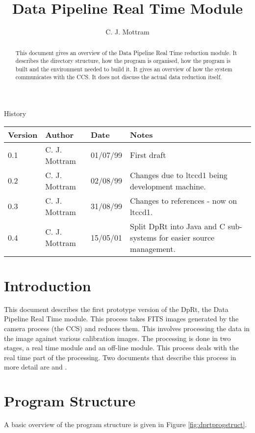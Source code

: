 \documentclass[10pt,a4paper]{article}
\title{Data Pipeline Real Time Module}
\author{C. J. Mottram}
\date{}
\begin{document}
\thispagestyle{empty}
\maketitle
\begin{abstract}
This document gives an overview of the Data Pipeline Real Time reduction module. It describes the directory structure,
how the program is organised, how the program is built and the environment needed to build it. It gives an overview
of how the system communicates with the CCS. It does not discuss the actual data reduction itself.
\end{abstract}

\centerline{\Large History}
\begin{center}
\begin{tabular}{|l|l|l|p{15em}|}
\hline
{\bf Version} & {\bf Author} & {\bf Date} & {\bf Notes} \\
\hline
0.1 & C. J. Mottram & 01/07/99 & First draft \\
0.2 & C. J. Mottram & 02/08/99 & Changes due to ltccd1 being development machine. \\
0.3 & C. J. Mottram & 31/08/99 & Changes to references - now on ltccd1. \\
0.4 & C. J. Mottram & 15/05/01 & Split DpRt into Java and C sub-systems for easier source management. \\
\hline
\end{tabular}
\end{center}

\newpage
\tableofcontents
\listoffigures
\listoftables
\newpage

\section{Introduction}
This document describes the first prototype version of the DpRt, the Data Pipeline Real Time module. This process
takes FITS images generated by the camera process (the CCS) and reduces them. This involves processing the data
in the image against various calibration images. The processing is done in two stages, a  real time
module and an off-line module. This process deals with the real time part of the processing. 
Two documents that describe this process in more detail are \cite{bib:ltpf} and \cite{bib:drpl}.

\section{Program Structure}
A basic overview of the program structure is given in Figure \ref{fig:dprtprogstruct}.
\end{document}
